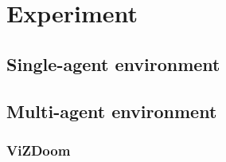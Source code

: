 \section{Experiment}
\subsection{Single-agent environment}
\subsection{Multi-agent environment}
\subsubsection{ViZDoom}

\iffalse
・交通ネットワーク - 大澤
・Atari - 田村
・VisDoom - 阿久澤

可能であれば
・ニューロエボリューション

乗せる図
・精度（Learning Curve）
・価値の評価をレイヤーごとに表示
\fi
